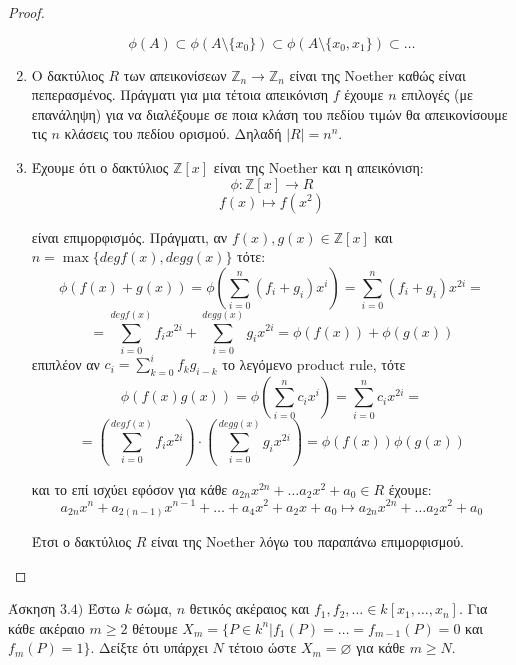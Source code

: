 \documentclass[oneside,a4paper]{article}
\newcommand {\tl}{\textlatin}
\newcommand{\Z}{\mathbb{Z}}
\begin{document}
\begin{proof}
\begin{enumerate}
		$$\phi(A) \subset \phi(A \setminus \{x_0\} ) \subset \phi(A \setminus \{x_0, x_1\} ) \subset \ldots$$

		\item Ο δακτύλιος $R$ των απεικονίσεων $\Z_n \rightarrow \Z_n$ είναι της \tl{Noether} καθώς είναι πεπερασμένος. Πράγματι για μια τέτοια απεικόνιση $f$ έχουμε $n$ επιλογές (με επανάληψη) για να διαλέξουμε σε ποια κλάση του πεδίου τιμών θα απεικονίσουμε τις $n$ κλάσεις του πεδίου ορισμού. Δηλαδή $|R| = n^n$.
		
		\item Έχουμε ότι ο δακτύλιος $\Z [x]$ είναι της \tl{Noether} και η απεικόνιση:
		$$\phi : \Z [x] \longrightarrow R$$
		$$f(x) \longmapsto f(x^2)$$

		είναι επιμορφισμός. Πράγματι, αν $f(x),g(x) \in \Z [x]$ και $n = \max \{degf(x),degg(x)\}$ τότε:
		$$\phi(f(x) + g(x))  = \phi \left( \sum\limits_{i=0}^n (f_i + g_i)x^i \right) = \sum\limits_{i=0}^n (f_i+g_i)x^{2i} = $$
		$$ = \sum\limits_{i=0}^{degf(x)} f_i x^{2i} + \sum\limits_{i=0}^{degg(x)} g_i x^{2i} = \phi(f(x)) + \phi(g(x))$$
		επιπλέον αν $c_i = \sum\limits_{k=0}^i f_k g_{i-k}$ το λεγόμενο \tl{product rule}, τότε
		$$ \phi (f(x)g(x)) = \phi \left( \sum\limits_{i=0}^n c_i x^i \right) = \sum\limits_{i=0}^n c_i x^{2i} = $$
		$$ = \left( \sum\limits_{i=0}^{degf(x)} f_i x^{2i} \right) \cdot \left(\sum\limits_{i=0}^{degg(x)} g_i x^{2i} \right)  = \phi(f(x)) \phi( g(x))$$

		και το επί ισχύει εφόσον για κάθε $a_{2n} x^{2n} + \ldots a_2 x^2 + a_0 \in R$ έχουμε:
		$$a_{2n} x^n + a_{2(n-1)}x^{n-1} + \ldots + a_4 x^2 + a_2 x + a_0 \longmapsto  a_{2n} x^{2n} + \ldots a_2 x^2 + a_0 $$

		Έτσι ο δακτύλιος $R$ είναι της \tl{Noether} λόγω του παραπάνω επιμορφισμού.
	\end{enumerate}
\end{proof}
\pagebreak

\noindent Άσκηση $3.4)$
\quad Έστω $k$ σώμα, $n$ θετικός ακέραιος και $f_1,f_2,\ldots \in k[x_1 ,\ldots, x_n]$. Για κάθε ακέραιο $m\geq 2$ θέτουμε $X_m = \{P \in k^n| f_1 (P) = \ldots = f_{m-1} (P) = 0$ και $f_m (P) = 1\}$. Δείξτε ότι υπάρχει $N$ τέτοιο ώστε $X_m = \varnothing$ για κάθε $m\geq N$.
\end{document}
